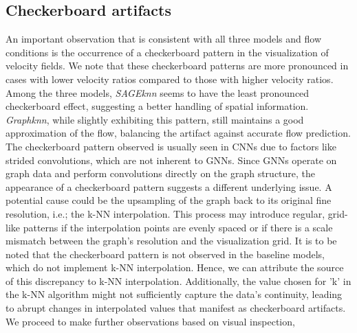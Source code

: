\subsection{Checkerboard artifacts}
An important observation that is consistent with all three models and flow conditions is the occurrence of a checkerboard pattern in the visualization of velocity fields. We note that these checkerboard patterns are more pronounced in cases with lower velocity ratios compared to those with higher velocity ratios. Among the three models, \textit{SAGEknn} seems to have the least pronounced checkerboard effect, suggesting a better handling of spatial information. \textit{Graphknn}, while slightly exhibiting this pattern, still maintains a good approximation of the flow, balancing the artifact against accurate flow prediction.\\
The checkerboard pattern observed is usually seen in CNNs due to factors like strided convolutions, which are not inherent to GNNs. Since GNNs operate on graph data and perform convolutions directly on the graph structure, the appearance of a checkerboard pattern suggests a different underlying issue. A potential cause could be the upsampling of the graph back to its original fine resolution, i.e.; the k-NN interpolation. This process may introduce regular, grid-like patterns if the interpolation points are evenly spaced or if there is a scale mismatch between the graph's resolution and the visualization grid. It is to be noted that the checkerboard pattern is not observed in the baseline models, which do not implement k-NN interpolation. Hence, we can attribute the source of this discrepancy to k-NN interpolation. Additionally, the value chosen for 'k' in the k-NN algorithm might not sufficiently capture the data's continuity, leading to abrupt changes in interpolated values that manifest as checkerboard artifacts. \\
We proceed to make further observations based on visual inspection, 
